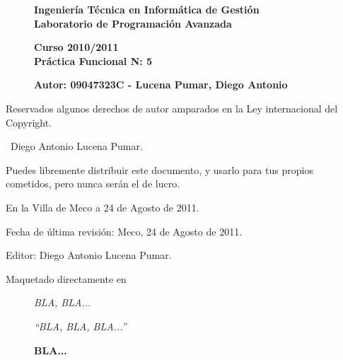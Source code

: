 \begin{figure}[hc]
\begin{titlepage}
\begin{center}
{\Large \textbf{Ingenier\'ia T\'ecnica en Inform\'atica de Gesti\'on\\Laboratorio de Programaci\'on Avanzada}}
\end{center}
\end{titlepage}
\end{figure}
\begin{figure}[hc]
\begin{center}
{\Large \textbf{Curso 2010/2011\\Pr\'actica Funcional N: 5}}
\end{center}
\end{figure}
\begin{figure}[hc]
\begin{center}
{\large \textbf{Autor: 09047323C - Lucena Pumar, Diego Antonio}}
\end{center}
\end{figure}
\newpage
Reservados algunos derechos de autor amparados en la Ley internacional del
Copyright.


\textcopyright\ Diego Antonio Lucena Pumar.



Puedes libremente distribuir este documento, y usarlo para tus propios
cometidos, pero nunca ser\'an el de lucro.



En la Villa de Meco a 24 de Agosto de 2011.


Fecha de \'ultima revisi\'on: Meco, 24 de Agosto de 2011.


Editor: Diego Antonio Lucena Pumar.


Maquetado directamente en \LaTeXe


\newpage
\begin{figure}[hc]
\begin{flushright}
\textit{\textit{BLA, BLA...}}
\end{flushright}
\end{figure}
\newpage{\pagestyle{empty}\cleardoublepage}
\begin{figure}[c]
\begin{flushright}
\textit{``BLA, BLA, BLA...''}
\end{flushright}
\begin{flushright}
\textbf{BLA...}
\end{flushright}
\end{figure}

